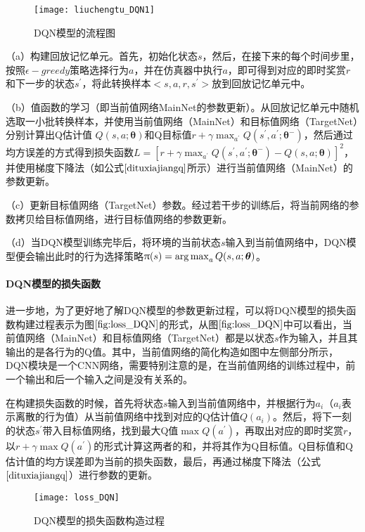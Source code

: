 \begin{figure}[htbp]
\centering
\texttt{[image: liuchengtu\_DQN1]}
\caption{DQN模型的流程图}
\label{fig:liuchengtu_DQN}
\end{figure}
 
（a）构建回放记忆单元。首先，初始化状态$s$，然后，在接下来的每个时间步里，按照$\epsilon-greedy$策略选择行为$a$，并在仿真器中执行$a$，即可得到对应的即时奖赏$r$和下一步的状态$s^{'}$，将此转换样本$<s, a, r, s^{'}>$放到回放记忆单元中。

（b）值函数的学习（即当前值网络MainNet的参数更新）。从回放记忆单元中随机选取一小批转换样本，并使用当前值网络（MainNet）和目标值网络（TargetNet）分别计算出Q估计值 $Q(s,a;\bm{\theta})$和Q目标值$r+\gamma \max_{a^{'}}Q(s^{'},a^{'};\bm{\theta}^{-})$，然后通过均方误差的方式得到损失函数$L=[r+\gamma \max_{a^{'}}Q(s^{'},a^{'};\bm{\theta}^{-})-Q(s,a;\bm{\theta})]^{2}$，并使用梯度下降法（如公式$\eqref{dituxiajiangq}$所示）进行当前值网络（MainNet）的参数更新。

（c）更新目标值网络（TargetNet）参数。经过若干步的训练后，将当前网络的参数拷贝给目标值网络，进行目标值网络的参数更新。 

（d）当DQN模型训练完毕后，将环境的当前状态$s$输入到当前值网络中，DQN模型便会输出此时的行为选择策略$\uppi(s)=\operatorname*{arg\,max}_{a}Q(s,a;\bm{\theta})$。

\paragraph{DQN模型的损失函数}
进一步地，为了更好地了解DQN模型的参数更新过程，可以将DQN模型的损失函数构建过程表示为图$\ref{fig:loss_DQN}$的形式，从图$\ref{fig:loss_DQN}$中可以看出，当前值网络（MainNet）和目标值网络（TargetNet）都是以状态$s$作为输入，并且其输出的是各行为的Q值。其中，当前值网络的简化构造如图中左侧部分所示，DQN模块是一个CNN网络，需要特别注意的是，在当前值网络的训练过程中，前一个输出和后一个输入之间是没有关系的。

在构建损失函数的时候，首先将状态$s$输入到当前值网络中，并根据行为$a_{i}$（$a_{i}$表示离散的行为值）从当前值网络中找到对应的Q估计值$Q(a_{i})$。然后，将下一刻的状态$s^{'}$带入目标值网络，找到最大Q值$\max Q(a^{'})$，再取出对应的即时奖赏$r$，以$r+\gamma \max Q(a^{'})$的形式计算这两者的和，并将其作为Q目标值。Q目标值和Q估计值的均方误差即为当前的损失函数，最后，再通过梯度下降法（公式$\eqref{dituxiajiangq}$）进行参数的更新。

\begin{figure}[htbp]
\centering
\texttt{[image: loss\_DQN]}
\caption{DQN模型的损失函数构造过程}
\label{fig:loss_DQN}
\end{figure}


